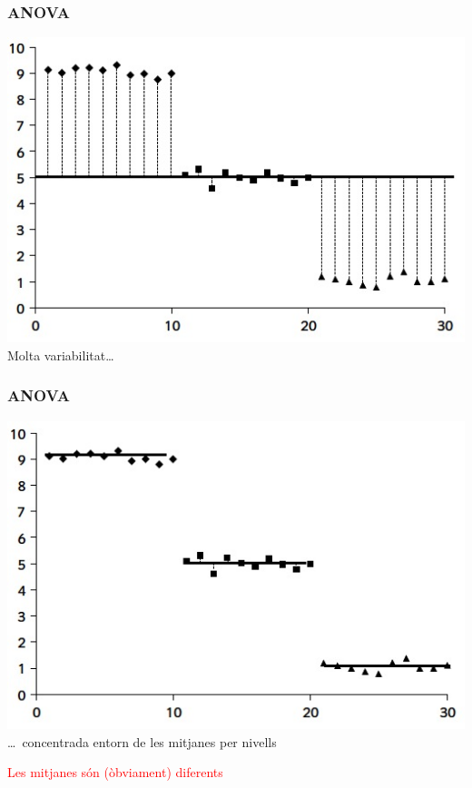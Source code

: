 \documentclass[12pt,t]{beamer}
\newcommand{\red}[1]{\textcolor{red}{#1}}
\theoremstyle{plain}
\theoremstyle{definition}
\begin{document}
\begin{frame}
\frametitle{ANOVA}

\begin{center}
\includegraphics[width=0.8\linewidth]{FD1-1}\\
Molta variabilitat\ldots 
\end{center}
\end{frame}

\begin{frame}
\frametitle{ANOVA}

\begin{center}
\includegraphics[width=0.8\linewidth]{FD1-2}\\
\ldots\ concentrada entorn de les mitjanes per nivells \\ 
\medskip

\red{Les mitjanes són (òbviament) diferents}

\end{center}
\end{frame}
\end{document}
